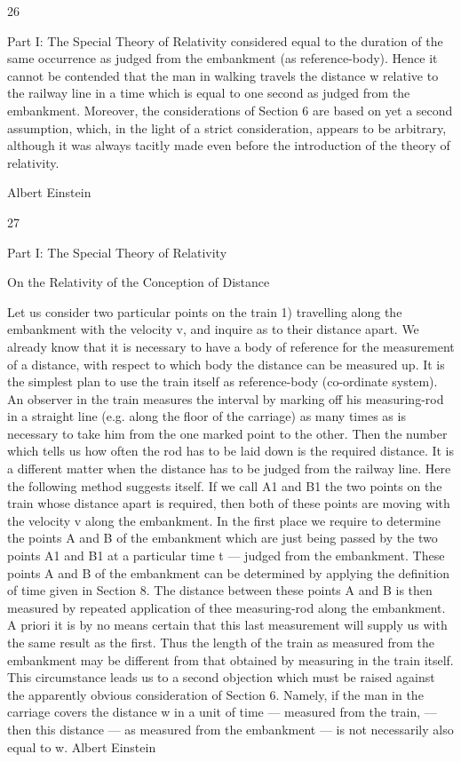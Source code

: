 \documentclass{article}
\begin{document}
26

Part I: The Special Theory of Relativity
considered equal to the duration of the same occurrence as judged from the embankment (as
reference-body). Hence it cannot be contended that the man in walking travels the distance
w relative to the railway line in a time which is equal to one second as judged from the
embankment.
Moreover, the considerations of Section 6 are based on yet a second assumption, which,
in the light of a strict consideration, appears to be arbitrary, although it was always tacitly
made even before the introduction of the theory of relativity.

Albert Einstein

27

Part I: The Special Theory of Relativity

On the Relativity of the
Conception of Distance

Let us consider two particular points on the train 1) travelling along the embankment with
the velocity v, and inquire as to their distance apart. We already know that it is necessary to
have a body of reference for the measurement of a distance, with respect to which body the
distance can be measured up. It is the simplest plan to use the train itself as reference-body
(co-ordinate system). An observer in the train measures the interval by marking off his
measuring-rod in a straight line (e.g. along the floor of the carriage) as many times as is
necessary to take him from the one marked point to the other. Then the number which tells
us how often the rod has to be laid down is the required distance.
It is a different matter when the distance has to be judged from the railway line. Here the
following method suggests itself. If we call A1 and B1 the two points on the train whose
distance apart is required, then both of these points are moving with the velocity v along the
embankment. In the first place we require to determine the points A and B of the
embankment which are just being passed by the two points A1 and B1 at a particular time t
— judged from the embankment. These points A and B of the embankment can be
determined by applying the definition of time given in Section 8. The distance between
these points A and B is then measured by repeated application of thee measuring-rod along
the embankment.
A priori it is by no means certain that this last measurement will supply us with the same
result as the first. Thus the length of the train as measured from the embankment may be
different from that obtained by measuring in the train itself. This circumstance leads us to a
second objection which must be raised against the apparently obvious consideration of
Section 6. Namely, if the man in the carriage covers the distance w in a unit of time —
measured from the train, — then this distance — as measured from the embankment — is
not necessarily also equal to w.
Albert Einstein
\end{document}
